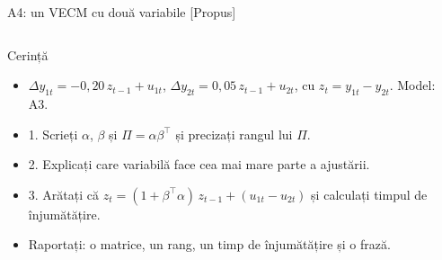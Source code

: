 \begin{frame}{A4: un VECM cu două variabile [Propus]}
\propsub
\itemsize{\scriptsize}
\begin{columns}[T]
\begin{column}{\taskw}
\begin{block}{Cerință}
\begin{itemize}
    \item $\Delta y_{1t} = -0{,}20\,z_{t-1} + u_{1t}$, $\Delta y_{2t} = 0{,}05\,z_{t-1} + u_{2t}$, cu $z_t = y_{1t} - y_{2t}$. Model: A3.
    \item 1. Scrieți $\alpha$, $\beta$ și $\Pi = \alpha\beta^\top$ și precizați rangul lui $\Pi$.
    \item 2. Explicați care variabilă face cea mai mare parte a ajustării.
    \item 3. Arătați că $z_t = (1 + \beta^\top\alpha)\,z_{t-1} + (u_{1t} - u_{2t})$ și calculați timpul de înjumătățire.
    \item Raportați: o matrice, un rang, un timp de înjumătățire și o frază.
\end{itemize}
\end{block}
\end{column}
\begin{column}{\solw}
\end{column}
\end{columns}
\end{frame}

